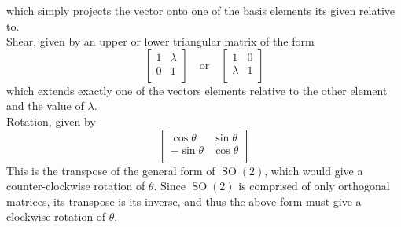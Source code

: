 which simply projects the vector onto one of the basis elements its given relative to.\\
Shear, given by an upper or lower triangular matrix of the form 
\[
    \begin{bmatrix}
        1 &\lambda    \\
         0&   1\\
    \end{bmatrix}\quad\text{or}\quad \begin{bmatrix}
        1 &   0\\
         \lambda &1   \\
    \end{bmatrix} 
\]
which extends exactly one of the vectors elements relative to the other element and the value of \(\lambda \).\\
Rotation, given by 
\[
    \begin{bmatrix}
        \cos \theta  &\sin \theta    \\
         -\sin \theta &\cos \theta    \\
    \end{bmatrix}
\]
This is the transpose of the general form of \(\operatorname{SO}(2) \), which would give a counter-clockwise rotation of \(\theta \). Since \(\operatorname{SO}(2) \) is comprised of only orthogonal matrices, its transpose is its inverse, and thus the above form must give a clockwise rotation of \(\theta \).